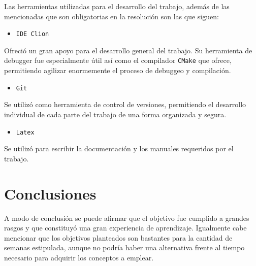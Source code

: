 \documentclass[a4paper]{article}
\begin{document}
Las herramientas utilizadas para el desarrollo del trabajo, además de las mencionadas que son obligatorias en la resolución son las que siguen:

\begin{itemize}
	\item \texttt{IDE Clion}
\end{itemize}

Ofreció un gran apoyo para el desarrollo general del trabajo. Su herramienta de debugger fue especialmente útil así como el compilador \texttt{CMake} que ofrece, permitiendo agilizar enormemente el proceso de debuggeo y compilación.

\begin{itemize}
	\item \texttt{Git}
\end{itemize}

Se utilizó como herramienta de control de versiones, permitiendo el desarrollo individual de cada parte del trabajo de una forma organizada y segura.

\begin{itemize}
	\item \texttt{Latex} 
\end{itemize} 

Se utilizó para escribir la documentación y los manuales requeridos por el trabajo.

\section{Conclusiones}

A modo de conclusión se puede afirmar que el objetivo fue cumplido a grandes rasgos y que constituyó una gran experiencia de aprendizaje. Igualmente cabe mencionar que los objetivos planteados son bastantes para la cantidad de semanas estipulada, aunque no podría haber una alternativa frente al tiempo necesario para adquirir los conceptos a emplear.
\end{document}
